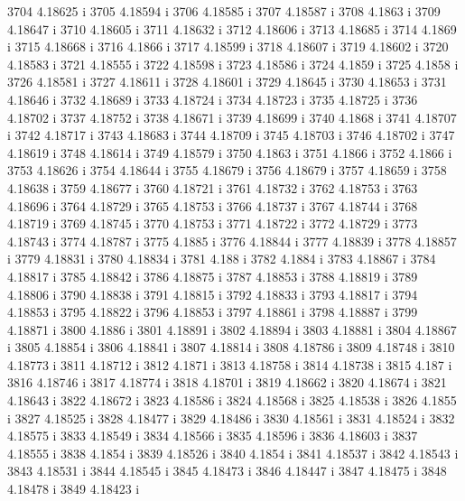  3704  4.18625  i
 3705  4.18594  i
 3706  4.18585  i
 3707  4.18587  i
 3708  4.1863  i
 3709  4.18647  i
 3710  4.18605  i
 3711  4.18632  i
 3712  4.18606  i
 3713  4.18685  i
 3714  4.1869  i
 3715  4.18668  i
 3716  4.1866  i
 3717  4.18599  i
 3718  4.18607  i
 3719  4.18602  i
 3720  4.18583  i
 3721  4.18555  i
 3722  4.18598  i
 3723  4.18586  i
 3724  4.1859  i
 3725  4.1858  i
 3726  4.18581  i
 3727  4.18611  i
 3728  4.18601  i
 3729  4.18645  i
 3730  4.18653  i
 3731  4.18646  i
 3732  4.18689  i
 3733  4.18724  i
 3734  4.18723  i
 3735  4.18725  i
 3736  4.18702  i
 3737  4.18752  i
 3738  4.18671  i
 3739  4.18699  i
 3740  4.1868  i
 3741  4.18707  i
 3742  4.18717  i
 3743  4.18683  i
 3744  4.18709  i
 3745  4.18703  i
 3746  4.18702  i
 3747  4.18619  i
 3748  4.18614  i
 3749  4.18579  i
 3750  4.1863  i
 3751  4.1866  i
 3752  4.1866  i
 3753  4.18626  i
 3754  4.18644  i
 3755  4.18679  i
 3756  4.18679  i
 3757  4.18659  i
 3758  4.18638  i
 3759  4.18677  i
 3760  4.18721  i
 3761  4.18732  i
 3762  4.18753  i
 3763  4.18696  i
 3764  4.18729  i
 3765  4.18753  i
 3766  4.18737  i
 3767  4.18744  i
 3768  4.18719  i
 3769  4.18745  i
 3770  4.18753  i
 3771  4.18722  i
 3772  4.18729  i
 3773  4.18743  i
 3774  4.18787  i
 3775  4.1885  i
 3776  4.18844  i
 3777  4.18839  i
 3778  4.18857  i
 3779  4.18831  i
 3780  4.18834  i
 3781  4.188  i
 3782  4.1884  i
 3783  4.18867  i
 3784  4.18817  i
 3785  4.18842  i
 3786  4.18875  i
 3787  4.18853  i
 3788  4.18819  i
 3789  4.18806  i
 3790  4.18838  i
 3791  4.18815  i
 3792  4.18833  i
 3793  4.18817  i
 3794  4.18853  i
 3795  4.18822  i
 3796  4.18853  i
 3797  4.18861  i
 3798  4.18887  i
 3799  4.18871  i
 3800  4.1886  i
 3801  4.18891  i
 3802  4.18894  i
 3803  4.18881  i
 3804  4.18867  i
 3805  4.18854  i
 3806  4.18841  i
 3807  4.18814  i
 3808  4.18786  i
 3809  4.18748  i
 3810  4.18773  i
 3811  4.18712  i
 3812  4.1871  i
 3813  4.18758  i
 3814  4.18738  i
 3815  4.187  i
 3816  4.18746  i
 3817  4.18774  i
 3818  4.18701  i
 3819  4.18662  i
 3820  4.18674  i
 3821  4.18643  i
 3822  4.18672  i
 3823  4.18586  i
 3824  4.18568  i
 3825  4.18538  i
 3826  4.1855  i
 3827  4.18525  i
 3828  4.18477  i
 3829  4.18486  i
 3830  4.18561  i
 3831  4.18524  i
 3832  4.18575  i
 3833  4.18549  i
 3834  4.18566  i
 3835  4.18596  i
 3836  4.18603  i
 3837  4.18555  i
 3838  4.1854  i
 3839  4.18526  i
 3840  4.1854  i
 3841  4.18537  i
 3842  4.18543  i
 3843  4.18531  i
 3844  4.18545  i
 3845  4.18473  i
 3846  4.18447  i
 3847  4.18475  i
 3848  4.18478  i
 3849  4.18423  i
